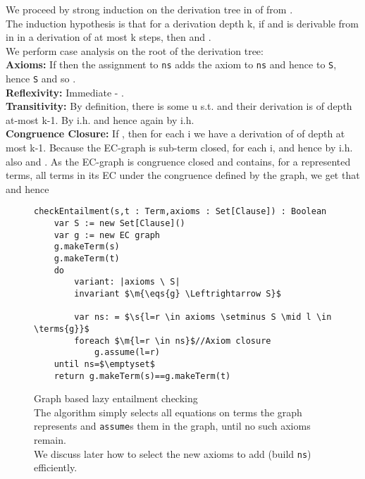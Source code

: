 \noindent
We proceed by strong induction on the derivation tree in  of  from .\\
The induction hypothesis is that for a derivation depth k, if  and  is derivable from  in  in a derivation of at most k steps, then  and .\\
We perform case analysis on the root of the derivation tree:\\
\textbf{Axioms:} If  then the assignment to \lstinline|ns| adds the axiom  to \lstinline|ns| and hence to \lstinline|S|, hence \lstinline|S| and so .\\
\textbf{Reflexivity:} Immediate - .\\
\textbf{Transitivity:} By definition, there is some u s.t.  and their derivation is of depth at-most k-1. By i.h.  and hence again by i.h. \\
\textbf{Congruence Closure:} If , then for each i we have a derivation of  of depth at most k-1.
Because the EC-graph is sub-term closed, for each i,  and hence by i.h. also  and . 
As the EC-graph is congruence closed and contains, for a represented terms, all terms in its EC under the congruence defined by the graph, we get that  and hence \\
\QED




\begin{figure}
\begin{lstlisting}
checkEntailment(s,t : Term,axioms : Set[Clause]) : Boolean
	var S := new Set[Clause]()
	var g := new EC graph
	g.makeTerm(s)
	g.makeTerm(t)
	do 
		variant: |axioms \ S|
		invariant $\m{\eqs{g} \Leftrightarrow S}$
		
		var ns: = $\s{l=r \in axioms \setminus S \mid l \in \terms{g}}$
		foreach $\m{l=r \in ns}$//Axiom closure
			g.assume(l=r)
	until ns=$\emptyset$
	return g.makeTerm(s)==g.makeTerm(t)
\end{lstlisting}
\caption{Graph based lazy entailment checking\\
The algorithm simply selects all equations on terms the graph represents and \lstinline|assume|s them in the graph, until no such axioms remain.\\
We discuss later how to select the new axioms to add (build \lstinline|ns|) efficiently.
}
\label{fig_lazy_congruence}
\end{figure}





